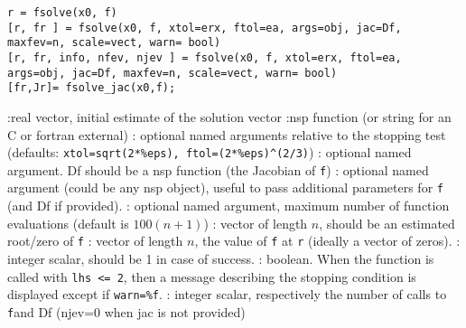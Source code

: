 
\begin{mandesc}
\end{mandesc}

\begin{calling_sequence}
\begin{verbatim}
r = fsolve(x0, f)
[r, fr ] = fsolve(x0, f, xtol=erx, ftol=ea, args=obj, jac=Df, maxfev=n, scale=vect, warn= bool) 
[r, fr, info, nfev, njev ] = fsolve(x0, f, xtol=erx, ftol=ea, args=obj, jac=Df, maxfev=n, scale=vect, warn= bool) 
[fr,Jr]= fsolve_jac(x0,f);
\end{verbatim}
\end{calling_sequence}
\begin{parameters}
  \begin{varlist}
    :real vector, initial estimate of the solution vector
    :nsp function (or string for an C or fortran external)
    : optional named arguments relative to the stopping test (defaults:
    \verb+xtol=sqrt(2*%eps), ftol=(2*%eps)^(2/3)+)
    : optional named argument. Df should be a nsp function (the Jacobian of \verb+f+)
    : optional named argument (could be any nsp object), useful to pass additional parameters for \verb+f+ (and
    Df if provided).
    : optional named argument, maximum number of function evaluations (default is $100(n+1)$)
    : vector of length $n$, should be an estimated root/zero of \verb+f+ 
    : vector of length $n$, the value of \verb+f+  at \verb+r+ (ideally a vector of zeros).
    : integer scalar, should be 1 in case of success.
    : boolean. When the function is called with \verb+lhs <= 2+, then a message describing the 
    stopping condition is displayed except if \verb+warn=%f+.
    : integer scalar, respectively the number of calls to \verb+f+and Df (njev=0 when jac is not provided)
  \end{varlist}
\end{parameters}

